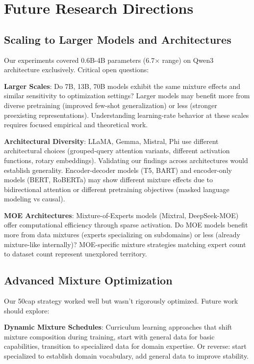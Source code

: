 \section{Future Research Directions}

\subsection{Scaling to Larger Models and Architectures}

Our experiments covered 0.6B-4B parameters (6.7$\times$ range) on Qwen3 architecture exclusively. Critical open questions:

\textbf{Larger Scales}: Do 7B, 13B, 70B models exhibit the same mixture effects and similar sensitivity to optimization settings? Larger models may benefit more from diverse pretraining (improved few-shot generalization) or less (stronger preexisting representations). Understanding learning-rate behavior at these scales requires focused empirical and theoretical work.

\textbf{Architectural Diversity}: LLaMA, Gemma, Mistral, Phi use different architectural choices (grouped-query attention variants, different activation functions, rotary embeddings). Validating our findings across architectures would establish generality. Encoder-decoder models (T5, BART) and encoder-only models (BERT, RoBERTa) may show different mixture effects due to bidirectional attention or different pretraining objectives (masked language modeling vs causal).

\textbf{MOE Architectures}: Mixture-of-Experts models (Mixtral, DeepSeek-MOE) offer computational efficiency through sparse activation. Do MOE models benefit more from data mixtures (experts specializing on subdomains) or less (already mixture-like internally)? MOE-specific mixture strategies matching expert count to dataset count represent unexplored territory.

\subsection{Advanced Mixture Optimization}

Our 50cap strategy worked well but wasn't rigorously optimized. Future work should explore:

\textbf{Dynamic Mixture Schedules}: Curriculum learning approaches that shift mixture composition during training, start with general data for basic capabilities, transition to specialized data for domain expertise. Or reverse: start specialized to establish domain vocabulary, add general data to improve stability.

